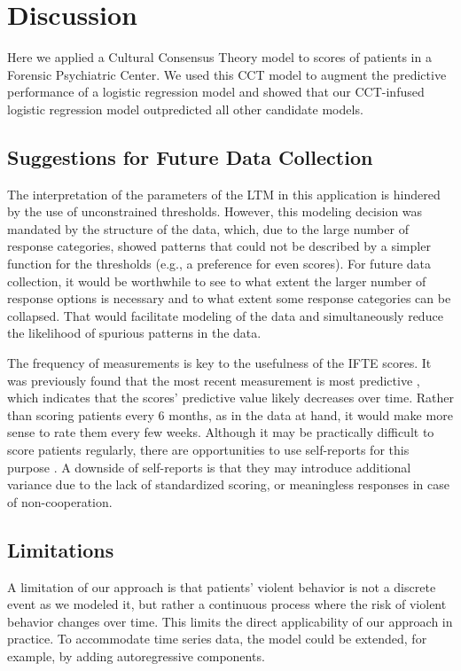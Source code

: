 \documentclass[a4paper,11pt]{article}
\begin{document}
\section{Discussion}
Here we applied a Cultural Consensus Theory model to scores of patients in a Forensic Psychiatric Center.
We used this CCT model to augment the predictive performance of a logistic regression model and showed that our CCT-infused logistic regression model outpredicted all other candidate models.


\subsection{Suggestions for Future Data Collection}

The interpretation of the parameters of the LTM in this application is hindered by the use of unconstrained thresholds.
However, this modeling decision was mandated by the structure of the data, which, due to the large number of response categories, showed patterns that could not be described by a simpler function for the thresholds (e.g., a preference for even scores).
For future data collection, it would be worthwhile to see to what extent the larger number of response options is necessary and to what extent some response categories can be collapsed.
That would facilitate modeling of the data and simultaneously reduce the likelihood of spurious patterns in the data.

The frequency of measurements is key to the usefulness of the IFTE scores.
It was previously found that the most recent measurement is most predictive \parencite{schuringa2019inpatient}, which indicates that the scores' predictive value likely decreases over time.
Rather than scoring patients every 6 months, as in the data at hand, it would make more sense to rate them every few weeks.
Although it may be practically difficult to score patients regularly, there are opportunities to use self-reports for this purpose \parencite{tuente2021mapping, bousardt2016predicting}.
A downside of self-reports is that they may introduce additional variance due to the lack of standardized scoring, or meaningless responses in case of non-cooperation.

\subsection{Limitations}
A limitation of our approach is that patients' violent behavior is not a discrete event as we modeled it, but rather a continuous process where the risk of violent behavior changes over time.
This limits the direct applicability of our approach in practice.
To accommodate time series data, the model could be extended, for example, by adding autoregressive components.
\end{document}
